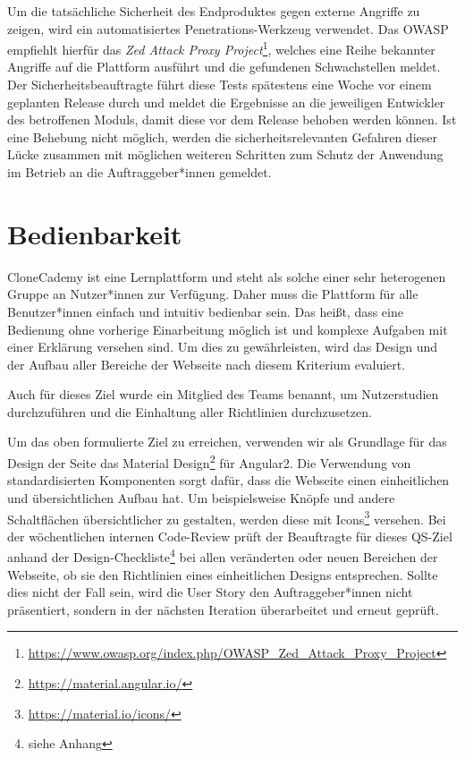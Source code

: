 \documentclass[accentcolor=tud0b,12pt,paper=a4]{tudreport}
\begin{document}
Um die tatsächliche Sicherheit des Endproduktes gegen externe Angriffe zu zeigen, wird ein automatisiertes Penetrations-Werkzeug verwendet. Das OWASP empfiehlt hierfür das \emph{Zed Attack Proxy Project}\footnote{\href{https://www.owasp.org/index.php/OWASP\_Zed\_Attack\_Proxy\_Project}{https://www.owasp.org/index.php/OWASP\_Zed\_Attack\_Proxy\_Project}}, welches eine Reihe bekannter Angriffe auf die Plattform ausführt und die gefundenen Schwachstellen meldet. Der Sicherheitsbeauftragte führt diese Tests spätestens eine Woche vor einem geplanten Release durch und meldet die Ergebnisse an die jeweiligen Entwickler des betroffenen Moduls, damit diese vor dem Release behoben werden können. Ist eine Behebung nicht möglich, werden die sicherheitsrelevanten Gefahren dieser Lücke zusammen mit möglichen weiteren Schritten zum Schutz der Anwendung im Betrieb an die Auftraggeber*innen gemeldet.


\section{Bedienbarkeit}
CloneCademy ist eine Lernplattform und steht als solche einer sehr heterogenen Gruppe an Nutzer*innen zur Verfügung. Daher muss die Plattform für alle Benutzer*innen einfach und intuitiv bedienbar sein. Das heißt, dass eine Bedienung ohne vorherige Einarbeitung möglich ist und komplexe Aufgaben mit einer Erklärung versehen sind. Um dies zu gewährleisten, wird das Design und der Aufbau aller Bereiche der Webseite nach diesem Kriterium evaluiert.

Auch für dieses Ziel wurde ein Mitglied des Teams benannt, um Nutzerstudien durchzuführen und die Einhaltung aller Richtlinien durchzusetzen.

Um das oben formulierte Ziel zu erreichen, verwenden wir als Grundlage für das Design der Seite das Material Design\footnote{\href{https://material.angular.io/}{https://material.angular.io/}} für Angular2. Die Verwendung von standardisierten Komponenten sorgt dafür, dass die Webseite einen einheitlichen und übersichtlichen Aufbau hat. Um beispielsweise Knöpfe und andere Schaltflächen übersichtlicher zu gestalten, werden diese mit Icons\footnote{\href{https://material.io/icons/}{https://material.io/icons/}} versehen. Bei der wöchentlichen internen Code-Review prüft der Beauftragte für dieses QS-Ziel anhand der Design-Checkliste\footnote{siehe Anhang} bei allen veränderten oder neuen Bereichen der Webseite, ob sie den Richtlinien eines einheitlichen Designs entsprechen. Sollte dies nicht der Fall sein, wird die User Story den Auftraggeber*innen nicht präsentiert, sondern in der nächsten Iteration überarbeitet und erneut geprüft.
\end{document}
